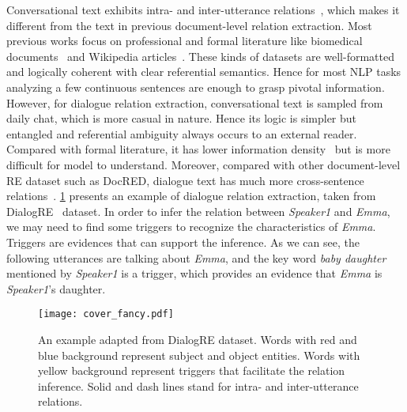 \documentclass[letterpaper]{article} \usepackage{aaai21}  \usepackage{times}  \usepackage{helvet} \usepackage{courier}  \usepackage[hyphens]{url}  \usepackage{graphicx} \urlstyle{rm} \def\UrlFont{\rm}  \usepackage{natbib}  \usepackage{caption} \frenchspacing  \setlength{\pdfpagewidth}{8.5in}  \setlength{\pdfpageheight}{11in}
\begin{document}
Conversational text exhibits intra- and inter-utterance relations~\cite{poria2020beneath}, which makes it different from the text
in previous document-level relation extraction. Most previous works focus on professional and formal
literature like biomedical documents~\cite{li2016biocreative,wu2019renet} and Wikipedia articles~\cite{elsahar2018t,yao2019docred,mesquita2019knowledgenet}.
These kinds of datasets are well-formatted and logically coherent with clear referential semantics.
Hence for most NLP tasks analyzing a few continuous sentences are enough to grasp pivotal information.
However, for dialogue relation extraction, conversational text is sampled from daily chat, which is more casual in nature.
Hence its logic is simpler but entangled and referential ambiguity always occurs to an external reader.
Compared with formal literature, it has lower information density~\cite{wang2011pilot} but is more difficult for model to understand. Moreover, compared with other document-level RE dataset such as DocRED, dialogue text has much more cross-sentence relations~\cite{yu2020dialogue}.
\cref{fig1} presents an example of dialogue relation extraction, taken from DialogRE~\cite{yu2020dialogue} dataset. In order to infer the relation between \textit{Speaker1} and \textit{Emma}, we may need to find some triggers to recognize the characteristics of \textit{Emma}. Triggers are evidences that can support the inference. As we can see, the following utterances are talking about \textit{Emma}, and the key word \textit{baby daughter} mentioned by \textit{Speaker1} is a trigger, which provides an evidence that \textit{Emma} is \textit{Speaker1}'s daughter.


\begin{figure}[t]
\centering
\texttt{[image: cover\_fancy.pdf]} \caption{An example adapted from DialogRE dataset. Words with red and blue background represent subject and object entities. Words with yellow background represent triggers that facilitate the relation inference. Solid and dash lines stand for intra- and inter-utterance relations.}
\label{fig1}
\end{figure}
\end{document}
